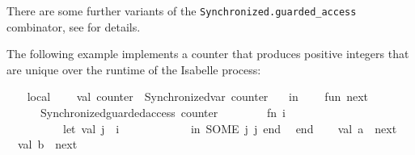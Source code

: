 \begin{isabellebody}
\begin{isamarkuptext}
  There are some further variants of the \verb|Synchronized.guarded_access| combinator, see \hyperlink{file.~~/src/Pure/Concurrent/synchronized.ML}{\mbox{}} for details.%
\end{isamarkuptext}%
\isamarkuptrue%
%
\endisatagmlref
{\isafoldmlref}%
%
\isadelimmlref
%
\endisadelimmlref
%
\isadelimmlex
%
\endisadelimmlex
%
\isatagmlex
%
\begin{isamarkuptext}%
The following example implements a counter that produces
  positive integers that are unique over the runtime of the Isabelle
  process:%
\end{isamarkuptext}%
\isamarkuptrue%
%
\endisatagmlex
{\isafoldmlex}%
%
\isadelimmlex
%
\endisadelimmlex
%
\isadelimML
%
\endisadelimML
%
\isatagML
{}\isamarkupfalse%
\ {}\isanewline
\ \ local\isanewline
\ \ \ \ val\ counter\ {}\ Synchronized{}var\ {}counter{}\ {}{}\isanewline
\ \ in\isanewline
\ \ \ \ fun\ next\ {}{}\ {}\isanewline
\ \ \ \ \ \ Synchronized{}guarded{}access\ counter\isanewline
\ \ \ \ \ \ \ \ {}fn\ i\ {}{}\isanewline
\ \ \ \ \ \ \ \ \ \ let\ val\ j\ {}\ i\ {}\ {}\isanewline
\ \ \ \ \ \ \ \ \ \ in\ SOME\ {}j{}\ j{}\ end{}{}\isanewline
\ \ end{}\isanewline
{}\isanewline
\isanewline
{}\isamarkupfalse%
\ {}\isanewline
\ \ val\ a\ {}\ next\ {}{}{}\isanewline
\ \ val\ b\ {}\ next\ {}{}{}\isanewline

\end{isabellebody}

